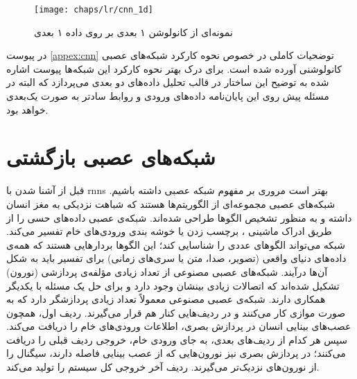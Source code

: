\begin{figure}[!ht]
	\centerline{\texttt{[image: chaps/lr/cnn\_1d]}}
	\caption{نمونه‌ای از کانولوشن ۱ بعدی بر روی داده ۱ بعدی}
	\label{fig:ch_lr:rnn}
\end{figure}
در پیوست \ref{appex:cnn} توضحیات کاملی در خصوص نحوه کارکرد شبکه‌های عصبی کانولوشنی آورده شده است. برای درک بهتر نحوه کارکرد این شبکه‌ها پیوست اشاره شده به توضیح این ساختار در قالب تحلیل داده‌های دو بعدی می‌پردازد که البته در مسئله پیش روی این پایان‌نامه داده‌های ورودی و روابط سادتر به صورت یک‌بعدی خواهد بود.

 \section{شبکه‌های عصبی بازگشتی}
 قبل از آشنا شدن با \glspl{rnn} بهتر است مروری بر مفهوم شبکه عصبی داشته باشیم. شبکه‌های عصبی مجموعه‌ای از الگوریتم‌ها هستند که شباهت نزدیکی به مغز انسان داشته و به منظور تشخیص الگوها طراحی شده‌اند. شبکه‌ی عصبی داده‌های حسی را از طریق ادراک ماشینی ، برچسب زدن یا خوشه بندی ورودی‌های خام تفسیر می‌کند. شبکه می‌تواند الگوهای عددی را شناسایی ‌کند؛ این الگوها بردارهایی هستند که همه‌ی داده‌های دنیای واقعی (تصویر، صدا، متن یا سری‌های زمانی) برای تفسیر باید به شکل آن‌ها درآیند. شبکه‌های عصبی مصنوعی از تعداد زیادی مؤلفه‌ی پردازشی (نورون) تشکیل شده‌اند که اتصالات زیادی بینشان وجود دارد و برای حل یک مسئله با یکدیگر همکاری دارند.
 شبکه‌ی عصبی مصنوعی معمولاً تعداد زیادی پردازشگر دارد که به صورت موازی کار می‌کنند و در ردیف‌هایی کنار هم قرار می‌گیرند. ردیف اول، همچون عصب‌های بینایی انسان در پردازش بصری، اطلاعات ورودی‌های خام را دریافت می‌کند. سپس هر کدام از ردیف‌های بعدی، به جای ورودی خام، خروجی ردیف قبلی را دریافت می‌کنند؛ در پردازش بصری نیز نورون‌هایی که از عصب بینایی فاصله دارند، سیگنال را از نورون‌های نزدیک‌تر می‌گیرند. ردیف آخر خروجی کل سیستم را تولید می‌کند.

